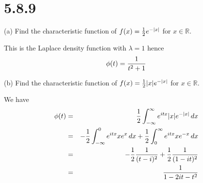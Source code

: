 \section*{5.8.9}
(a) Find the characteristic function of
$f(x)={1\over2}e^{-|x|}$ for $x\in\mathbb R$.

\bigskip
\noindent
This is the Laplace density function with $\lambda=1$ hence
$$\phi(t)={1\over t^2+1}$$

\bigskip
\noindent
(b) Find the characteristic function of
$f(x)={1\over2}|x|e^{-|x|}$ for $x\in\mathbb R$.

\bigskip
\noindent
We have
\begin{eqnarray*}
\phi(t)&=&{1\over2}\int_{-\infty}^\infty e^{itx}
|x|e^{-|x|}\,dx\\
&=&-{1\over2}\int_{-\infty}^0e^{itx}xe^x\,dx
+{1\over2}\int_0^\infty e^{itx}xe^{-x}\,dx\\
&=&-{1\over2}{1\over(t-i)^2}+{1\over2}{1\over(1-it)^2}\\
&=&{1\over1-2it-t^2}
\end{eqnarray*}
